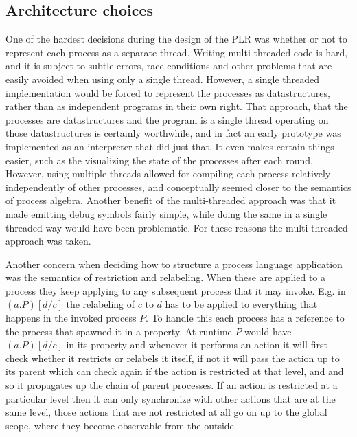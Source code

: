	\subsection{Architecture choices}\label{sec:cil_architecture}
	One of the hardest decisions during the design of the PLR was whether or not 
	to represent each process as a separate thread. Writing multi-threaded code 
	is hard, and it is subject to subtle errors, race conditions and other 
	problems that are easily avoided when using only a single thread. However, a 
	single threaded implementation would be forced to represent the processes as 
	datastructures, rather than as independent programs in their own right. 
	That approach, that the processes are datastructures and the program is a 
	single thread operating on those datastructures is certainly worthwhile, and 
	in fact an early prototype was implemented as an interpreter that did just 
	that. It even makes certain things easier, such as the visualizing the state 
	of the processes after each round. However, using multiple threads allowed 
	for compiling each process relatively independently of other processes, and 
	conceptually seemed closer to the semantics of process algebra. Another
	benefit of the multi-threaded approach was that it made emitting debug 
	symbols fairly simple, while doing the same in a single threaded way would 
	have been problematic. For these reasons the multi-threaded approach was 
	taken.
	
	Another concern when deciding how to structure a process language 
	application was the semantics of restriction and relabeling. When these are 
	applied to a process they keep applying to any subsequent process that it 
	may invoke. E.g. in $(a . P)[d/c]$ the relabeling of $c$ to $d$ has to be 
	applied to everything that happens in the invoked process $P$. To handle 
	this each process has a reference to the process that spawned it in a 
	 property. At runtime $P$ would have $(a . P)[d/c]$ in its 
	 property and whenever it performs an action it will first 
	check whether it restricts or relabels it itself, if not it will pass the 
	action up to its parent which can check again if the action is restricted at 
	that level, and and so it propagates up the chain of parent processes. If an 
	action is restricted at a particular level then it can only synchronize with 
	other actions that are at the same level, those actions that are not 
	restricted at all go on up to the global scope, where they become observable 
	from the outside.
	
